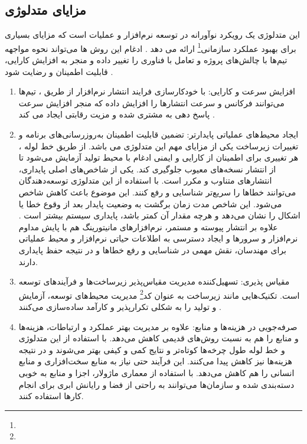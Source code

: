 \subsection{مزایای متدلوژی }
این متدلوژی یک رویکرد نوآورانه‌ در توسعه نرم‌افزار و عملیات است که مزایای بسیاری برای بهبود عملکرد سازمانی\footnote{} ارائه می دهد \cite{Devopsorg}. ادغام این روش ها می‌تواند نحوه مواجهه تیم‌ها با چالش‌های پروژه و تعامل با فناوری را تغییر داده و منجر به افزایش کارایی، قابلیت اطمینان و رضایت شود \cite{DevopsDef2}.
\begin{enumerate}
	\item 
افزایش سرعت و کارایی: با خودکارسازی فرایند انتشار نرم‌افزار از طریق ، تیم‌ها می‌توانند فرکانس و سرعت انتشارها را افزایش داده که منجر افزایش سرعت پاسخ دهی به مشتری شده و مزیت رقابتی ایجاد می کند \cite{DevopsCICD1}.
	\item
ایجاد محیط‌های عملیاتی پایدارتر: تضمین قابلیت اطمینان به‌روزرسانی‌های برنامه و تغییرات زیرساخت یکی از مزایای مهم این متدلوژی می باشد. از طریق خط لوله ، هر تغییری برای اطمینان از کارایی و ایمنی ادغام با محیط تولید آزمایش می‌شود تا از انتشار نسخه‌های معیوب جلوگیری ‌کند. 
یکی از شاخص‌های اصلی پایداری، انتشارهای متناوب و مکرر است. با استفاده از این متدلوژی توسعه‌دهندگان می‌توانند خطاها را سریع‌تر شناسایی و رفع کنند. این موضوع باعث کاهش شاخص  می‌شود. این شاخص مدت زمان برگشت به وضعیت پایدار بعد از وقوع خطا یا اشکال را نشان می‌دهد و هرچه مقدار آن کمتر باشد، پایداری سیستم بیشتر است \cite{DevopsCD}.
علاوه بر انتشار پیوسته و مستمر، نرم‌افزارهای مانیتورینگ هم با پایش مداوم نرم‌افزار و سرور‌ها و ایجاد دسترسی به اطلاعات حیاتی نرم‌افزار و محیط عملیاتی برای مهندسان، نقش مهمی در شناسایی و رفع خطاها و در نتیجه حفظ پایداری دارند.
	\item 
مقیاس پذیری: تسهیل‌کننده مدیریت مقیاس‌پذیر زیرساخت‌ها و فرآیندهای توسعه است. تکنیک‌هایی مانند زیرساخت به عنوان کد\footnote{} مدیریت محیط‌های توسعه، آزمایش و تولید را به شکلی تکرارپذیر و کارآمد ساده‌سازی می‌کنند \cite{DevopsDef2}.
	\item 
صرفه‌جویی در هزینه‌ها و منابع: علاوه بر مدیریت بهتر عملکرد و ارتباطات، هزینه‌ها و منابع را هم به نسبت روش‌های قدیمی کاهش می‌دهد. 
با استفاده از این متدلوژی و خط لوله  طول چرخه‌ها کوتاه‌تر و نتایج کمی و کیفی بهتر می‌شوند و در نتیجه هزینه‌ها نیز کاهش پیدا می‌کنند. این فرآیند حتی نیاز به منابع سخت‌افزاری و منابع انسانی را هم کاهش می‌دهد. با استفاده از معماری ماژولار، اجزا و منابع به خوبی دسته‌بندی شده و سازمان‌ها می‌توانند به راحتی از فضا و رایانش ابری برای انجام کارها استفاده کنند.

\end{enumerate}
